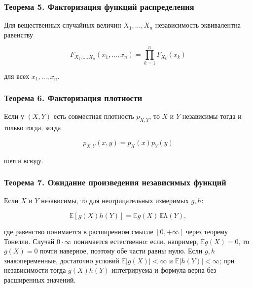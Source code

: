 \documentclass[
  11pt,
  a4paper,
]{article}
\begin{document}
\subsubsection{Теорема 5. Факторизация функций
распределения}\label{ux442ux435ux43eux440ux435ux43cux430-5.-ux444ux430ux43aux442ux43eux440ux438ux437ux430ux446ux438ux44f-ux444ux443ux43dux43aux446ux438ux439-ux440ux430ux441ux43fux440ux435ux434ux435ux43bux435ux43dux438ux44f}

Для вещественных случайных величин \(X_1,\ldots,X_n\) независимость
эквивалентна равенству

\[
F_{X_1,\ldots,X_n}(x_1,\ldots,x_n)
=
\prod_{k=1}^n F_{X_k}(x_k)
\]

для всех \(x_1,\ldots,x_n\).

\subsubsection{Теорема 6. Факторизация
плотности}\label{ux442ux435ux43eux440ux435ux43cux430-6.-ux444ux430ux43aux442ux43eux440ux438ux437ux430ux446ux438ux44f-ux43fux43bux43eux442ux43dux43eux441ux442ux438}

Если у \((X,Y)\) есть совместная плотность \(p_{X,Y}\), то \(X\) и \(Y\)
независимы тогда и только тогда, когда

\[
p_{X,Y}(x,y)=p_X(x)p_Y(y)
\]

почти всюду.

\subsubsection{Теорема 7. Ожидание произведения независимых
функций}\label{ux442ux435ux43eux440ux435ux43cux430-7.-ux43eux436ux438ux434ux430ux43dux438ux435-ux43fux440ux43eux438ux437ux432ux435ux434ux435ux43dux438ux44f-ux43dux435ux437ux430ux432ux438ux441ux438ux43cux44bux445-ux444ux443ux43dux43aux446ux438ux439}

Если \(X\) и \(Y\) независимы, то для неотрицательных измеримых \(g,h\):

\[
\mathbb E[g(X)h(Y)]
=
\mathbb E g(X)\,\mathbb E h(Y),
\]

где равенство понимается в расширенном смысле \([0,+\infty]\) через
теорему Тонелли. Случай \(0\cdot\infty\) понимается естественно: если,
например, \(\mathbb E g(X)=0\), то \(g(X)=0\) почти наверное, поэтому
обе части равны нулю. Если \(g,h\) знакопеременные, достаточно условий
\(\mathbb E|g(X)|<\infty\) и \(\mathbb E|h(Y)|<\infty\); при
независимости тогда \(g(X)h(Y)\) интегрируема и формула верна без
расширенных значений.
\end{document}
